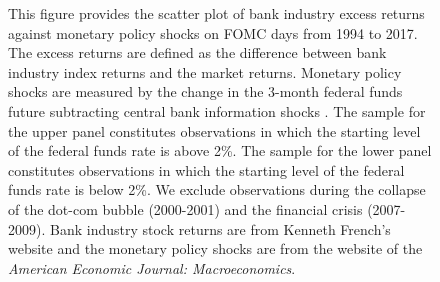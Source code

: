 \documentclass[12pt]{article}
\begin{document}
\begin{figure}[h]
\begin{centering}
	\end{centering}
	{\footnotesize{This figure provides the scatter plot of bank industry excess returns against monetary policy shocks on FOMC days from 1994 to 2017. The excess  returns are defined as the difference between bank industry index returns and the market returns. Monetary policy shocks are measured by the change in the 3-month federal funds future subtracting  central bank information shocks \citep{JarocinskiKaradi2018}. The sample for the upper panel constitutes observations in which the starting level of the federal funds rate is above 2\%. The sample for the lower panel constitutes observations in which the starting level of the federal funds rate is below 2\%. We exclude observations during the collapse of the dot-com bubble (2000-2001) and the financial crisis (2007-2009). Bank industry stock returns are  from Kenneth French's website and the monetary policy shocks are  from the website of the \textit{American Economic Journal: Macroeconomics}.}}
\end{figure}
\end{document}
